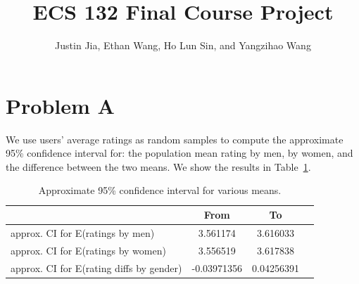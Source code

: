 \documentclass[12pt]{elsarticle}
\begin{document}

\title{ECS 132 Final Course Project}




\author{Justin Jia, Ethan Wang, Ho Lun Sin, and Yangzihao Wang}

\address{\{bwjia,eycwang,hsin,yzhwang\}@ucdavis.edu}

\maketitle






\section{Problem A}
\label{PA}
We use users' average ratings as random samples to compute the approximate 95\% confidence
interval for: the population mean rating by men, by women, and the difference between the two means. We show the results in Table~\ref{tab1}.
\begin{table}[ht]
\begin{tabular}{l*{2}{c}r}
                 & From & To \\
\hline
approx. CI for E(ratings by men) & 3.561174 & 3.616033 \\
approx. CI for E(ratings by women) & 3.556519 & 3.617838  \\
approx. CI for E(rating diffs by gender) & -0.03971356 & 0.04256391\\
\end{tabular}
\caption{Approximate 95\% confidence interval for various means.}
\label{tab1}
\end{table}
\end{document}
